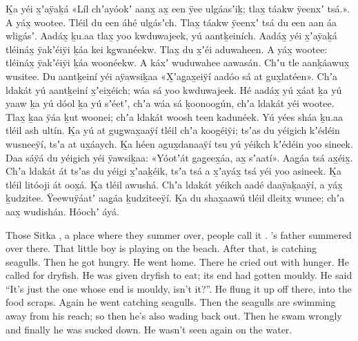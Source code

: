 \begin{pairs}
\begin{Leftside}
\pstart
{}Ḵa yéi x̱ʼaÿaḵá
«\!Líl chʼayóokʼ aanx̱ ax̱ een ÿee ulgáasʼiḵ; tlax̱ táakw ÿeenxʼ tsá.\!».
A yáx̱ wootee.\hspace{-1ex}
\qqk{}Tléil du een áhé ulgásʼch.\hspace{-1ex}
\qqk{}Tlax̱ táakw ÿeenxʼ tsá du een aan áa wligásʼ.
Aadáx̱ ḵu.aa tlax̱ yoo kwduwajeek, yú aantḵeiních.
Aadáx̱ yéi x̱ʼaÿaḵá tléináx̱ ÿakʼéiÿi ḵáa kei kg̱wanéekw.
Tlax̱ du x̱ʼéi aduwaheen.
A yáx̱ wootee: 
tléináx̱ ÿakʼéiÿi ḵáa woonéekw.
A káxʼ wuduwahee aawasán.
Chʼu tle aanḵáawux̱ wusitee.
Du aant\-ḵeiní yéi aÿawsiḵaa
«\!X̱ʼag̱ax̱eiÿí aadóo sá at gux̱latéen\!».
Chʼa ldakát yú aantḵeiní x̱ʼeix̱éich; 
wáa sá yoo kwduwajeek.
Hé aadáx̱ yú x̱áat ḵa yú yaaw ḵa yú dóol ḵa yú sʼéetʼ,
chʼa wáa sá ḵoonoogún, chʼa ldakát yéi wootee.
Tlax̱ ḵaa ÿáa ḵut woonei;
chʼa ldakát woosh teen kadunéek.
Yú yées sháa ḵu.aa tléil ash ultín.
Ḵa yú at gug̱wax̱aaÿí tléil chʼa koogéiÿi;
tsʼas du yéigich kʼédéin wusneeÿí, tsʼa at ux̱áaych.
Ḵa héen agux̱danaaÿí tsu yú yéikch kʼédéin yoo sineek.
Daa sáÿá du yéigich yéi ÿawsiḵaa:
«\!Yóo\-tʼát gag̱eex̱áa, ax̱ sʼaatí\!».
Aag̱áa tsá ax̱éix̱.
Chʼa ldakát át tsʼas du yéigi x̱ʼaaḵéik, tsʼa tsá a x̱ʼayáx̱ tsá yéi yoo asineek.
Ḵa tléil litóoji át oox̱á.
Ḵa tléil awushá.
Chʼa ldakát yéikch aadé daaÿaḵaaÿí, a yáx̱ ḵudzitee.
Ÿeewuÿáatʼ aag̱áa ḵudziteeÿí.
Ḵa du shax̱aawú tléil dleitx̱ wunee;
chʼa aax̱ wu\-dishán.
Hóochʼ áyá.
\pend
\endnumbering
\end{Leftside}
\begin{Rightside}
\beginnumbering
\pstart\noindent
{}Those Sitka , a place where they summer over, people call it .
’s father summered over there.
That little boy is playing on the beach.
After that,  is catching seagulls.
Then he got hungry.
He went home.
There he cried out with hunger.
He called for dryfish.
He was given dryfish to eat;
its end had gotten mouldy.
He said “It’s just the one whose end is mouldy, isn’t it?”.
He flung it up off there, into the food scraps.
Again he went catching seagulls.
Then the seagulls are swimming away from his reach;
so then he’s also wading back out.
Then he swam wrongly and finally he was sucked down.
He wasn’t seen again on the water.
\pend


\end{Rightside}
\end{pairs}
